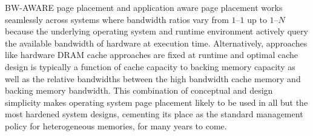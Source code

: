 BW-AWARE page placement and application aware page placement works seamlessly
across systems where bandwidth ratios vary from $1–1$ up to $1–N$ because the
underlying operating system and runtime environment actively query the available
bandwidth of hardware at execution time. Alternatively, approaches like hardware
DRAM cache approaches are fixed at runtime and optimal cache design is typically
a function of cache capacity to backing memory capacity as well as the relative
bandwidths between the high bandwidth cache memory and backing memory bandwidth.
This combination of conceptual and design simplicity makes operating system page
placement likely to be used in all but the most hardened system designs,
cementing its place as the standard management policy for heterogeneous
memories, for many years to come.


